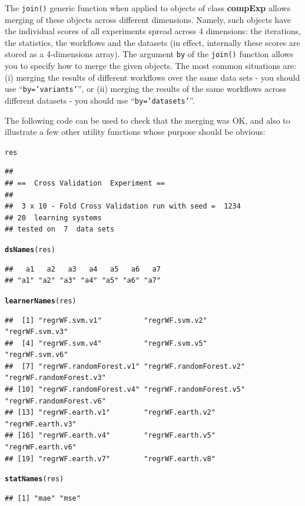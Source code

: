 \documentclass[10pt,a4paper]{article}\usepackage[]{graphicx}\usepackage[]{color}
\makeatletter
\newcommand{\hlstd}[1]{\textcolor[rgb]{0.345,0.345,0.345}{#1}}%
\newcommand{\hlkwd}[1]{\textcolor[rgb]{0.737,0.353,0.396}{\textbf{#1}}}%
\newenvironment{kframe}{%
 \def\at@end@of@kframe{}%
 \ifinner\ifhmode%
  \def\at@end@of@kframe{\end{minipage}}%
  \begin{minipage}{\columnwidth}%
 \fi\fi%
 \def\FrameCommand##1{\hskip\@totalleftmargin \hskip-\fboxsep
 \colorbox{shadecolor}{##1}\hskip-\fboxsep
     \hskip-\linewidth \hskip-\@totalleftmargin \hskip\columnwidth}%
 \MakeFramed {\advance\hsize-\width
   \@totalleftmargin\z@ \linewidth\hsize
   \@setminipage}}%
 {\par\unskip\endMakeFramed%
 \at@end@of@kframe}
\newenvironment{knitrout}{}{} %
\makeatother
\begin{document}
The \texttt{join()} generic function when applied to objects of class
\textbf{compExp} allows merging of these objects across different
dimensions. Namely, such objects have the individual scores of all
experiments spread across 4 dimensions: the iterations, the
statistics, the workflows and the datasets (in effect, internally
these scores are stored as a 4-dimensions array). The argument
\texttt{by} of the \texttt{join()} function allows you to specify how
to merge the given objects. The most common situations are: (i)
merging the results of different workflows over the same data sets -
you should use ``\texttt{by='variants'}'', or (ii) merging the results
of the same workflows across different datasets - you should use
``\texttt{by='datasets'}''.

The following code can be used to check that the merging was OK, and
also to illustrate a few other utility functions whose purpose should
be obvious:




\begin{knitrout}
\color{fgcolor}\begin{kframe}
\begin{alltt}
\hlstd{res}
\end{alltt}
\begin{verbatim}
## 
## ==  Cross Validation  Experiment ==
## 
##  3 x 10 - Fold Cross Validation run with seed =  1234 
## 20  learning systems
## tested on  7  data sets
\end{verbatim}
\begin{alltt}
\hlkwd{dsNames}\hlstd{(res)}
\end{alltt}
\begin{verbatim}
##   a1   a2   a3   a4   a5   a6   a7 
## "a1" "a2" "a3" "a4" "a5" "a6" "a7"
\end{verbatim}
\begin{alltt}
\hlkwd{learnerNames}\hlstd{(res)}
\end{alltt}
\begin{verbatim}
##  [1] "regrWF.svm.v1"          "regrWF.svm.v2"          "regrWF.svm.v3"         
##  [4] "regrWF.svm.v4"          "regrWF.svm.v5"          "regrWF.svm.v6"         
##  [7] "regrWF.randomForest.v1" "regrWF.randomForest.v2" "regrWF.randomForest.v3"
## [10] "regrWF.randomForest.v4" "regrWF.randomForest.v5" "regrWF.randomForest.v6"
## [13] "regrWF.earth.v1"        "regrWF.earth.v2"        "regrWF.earth.v3"       
## [16] "regrWF.earth.v4"        "regrWF.earth.v5"        "regrWF.earth.v6"       
## [19] "regrWF.earth.v7"        "regrWF.earth.v8"
\end{verbatim}
\begin{alltt}
\hlkwd{statNames}\hlstd{(res)}
\end{alltt}
\begin{verbatim}
## [1] "mae" "mse"
\end{verbatim}
\end{kframe}
\end{knitrout}
\end{document}
